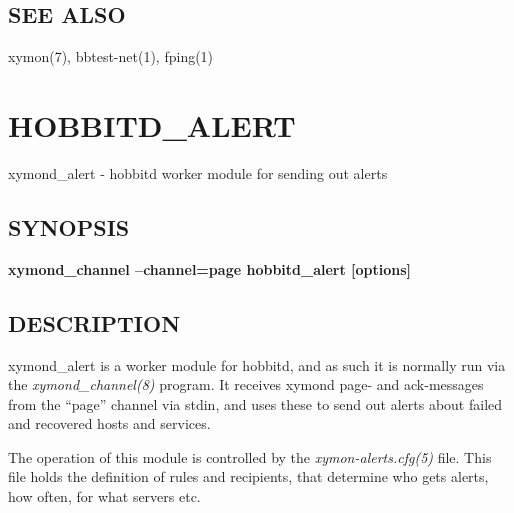 \subsection{SEE ALSO}
xymon(7), bbtest-net(1), fping(1) 

 
%
\newpage
\section{HOBBITD\_ALERT}

 xymond\_alert - hobbitd worker module for sending out alerts

 \subsection{SYNOPSIS}
\textbf{xymond\_channel --channel=page hobbitd\_alert [options]}


 
\subsection{DESCRIPTION}
 xymond\_alert is a worker module for hobbitd, and as such it is
 normally run via the \emph{xymond\_channel(8)} program. It receives
 xymond page- and ack-messages from the ``page'' channel via stdin,
 and uses these to send out alerts about failed and recovered hosts
 and services. 


  The operation of this module is controlled by the
  \emph{xymon-alerts.cfg(5)} file. This file holds the definition of
  rules and recipients, that determine who gets alerts, how often, for
  what servers etc. 



 
